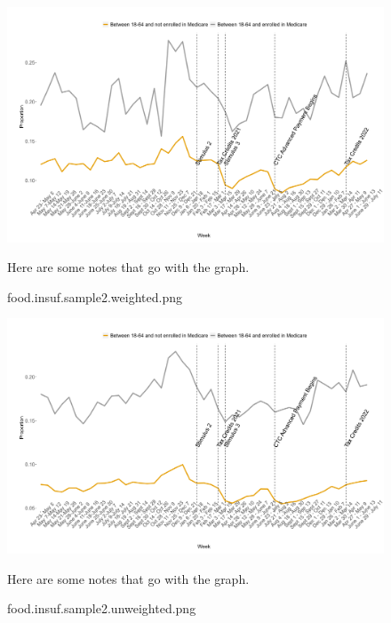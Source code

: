 \documentclass[12pt]{article}
\begin{document}
\begin{figure}[!ht]\label{food.insuf.sample2.weighted.png}
\caption{food.insuf.sample2.weighted.png}
\centering
\includegraphics[scale=0.3]{food.insuf.sample2.weighted.png}
\medskip 
\begin{minipage}{0.65\textwidth} 
{\footnotesize Here are some notes that go with the graph.  \par}
\end{minipage}
\end{figure}

\begin{figure}[!ht]\label{food.insuf.sample2.unweighted.png}
\caption{food.insuf.sample2.unweighted.png}
\centering
\includegraphics[scale=0.3]{food.insuf.sample2.unweighted.png}
\medskip 
\begin{minipage}{0.65\textwidth} 
{\footnotesize Here are some notes that go with the graph.  \par}
\end{minipage}
\end{figure}
\end{document}
